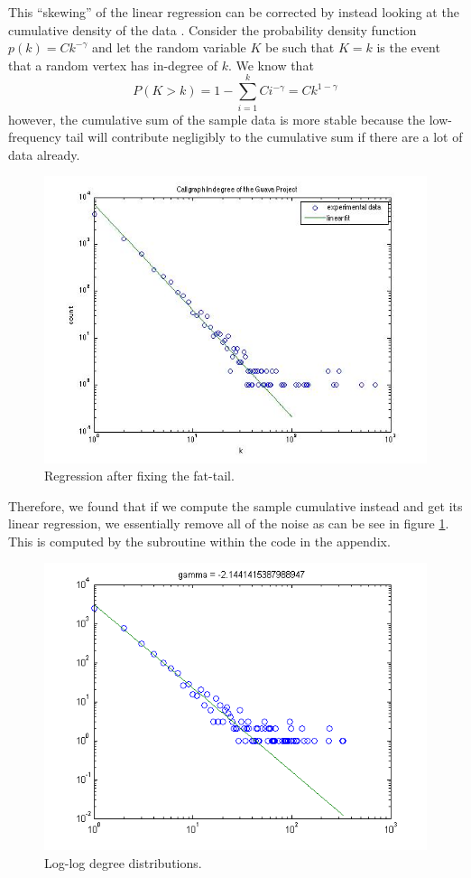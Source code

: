 \documentclass[11pt,a4paper,twocolumn]{article}
\begin{document}
\begin{singlespace}
This ``skewing'' of the linear regression can be corrected by instead looking at the
cumulative density of the data \cite{CLASS}. Consider the probability density function
$p(k) = C k^{-\gamma}$ and let the random variable $K$ be such that $K = k$ is the
event that a random vertex has in-degree of $k$. We know that 
$$P(K > k) = 1 - \sum_{i = 1}^k Ci^{-\gamma} = Ck^{1 - \gamma}$$
however, the cumulative sum of the sample data is more stable because the low-frequency
tail will contribute negligibly to the cumulative sum if there are a lot of data already.
\begin{figure}[H]
\centering
\includegraphics[scale=0.45]{images/guava}
\caption{Regression after fixing the fat-tail.\label{fig:guava}}
\end{figure}
Therefore, we found that if we compute the sample cumulative instead and get its 
linear regression, we essentially remove all of the noise as can be see in figure 
\ref{fig:guava}. 
This is computed by the  subroutine within the code in 
the appendix.
\begin{figure}
\centering
\caption{Log-log degree distributions.\label{fig:deg}}
\includegraphics[scale=0.5]{images/antlr}

\end{figure}
\end{singlespace}
\end{document}
